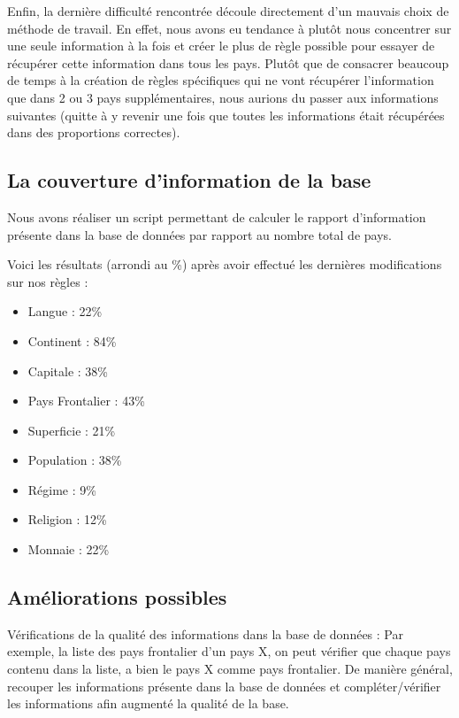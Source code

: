 \documentclass[11pt,a4paper]{article}
\begin{document}
Enfin, la dernière difficulté rencontrée découle directement d'un mauvais choix de méthode de travail.
En effet, nous avons eu tendance à plutôt nous concentrer sur une seule information à la fois et créer le plus de règle possible pour essayer de récupérer cette information dans tous les pays.
Plutôt que de consacrer beaucoup de temps à la création de règles spécifiques qui ne vont récupérer l'information que dans 2 ou 3 pays supplémentaires, nous aurions du passer aux informations suivantes (quitte à y revenir une fois que toutes les informations était récupérées dans des proportions correctes).

\subsection{La couverture d'information de la base}
Nous avons réaliser un script permettant de calculer le rapport d'information présente dans la base de données par rapport au nombre total de pays.

Voici les résultats (arrondi au \%) après avoir effectué les dernières modifications sur nos règles :
\begin{itemize}
	\item Langue 		  : 22\%
	\item Continent 	  : 84\%
	\item Capitale 		  : 38\%
	\item Pays Frontalier : 43\%
	\item Superficie	  : 21\%
	\item Population 	  : 38\%
	\item Régime 		  : 9\%
	\item Religion		  : 12\%
	\item Monnaie		  : 22\%
\end{itemize}

  


\subsection{Améliorations possibles}

Vérifications de la qualité des informations dans la base de données :
Par exemple, la liste des pays frontalier d'un pays X, on peut vérifier que chaque pays contenu dans la liste, a bien le pays X comme pays frontalier.
De manière général, recouper les informations présente dans la base de données et compléter/vérifier les informations afin augmenté la qualité de la base.
\end{document}
